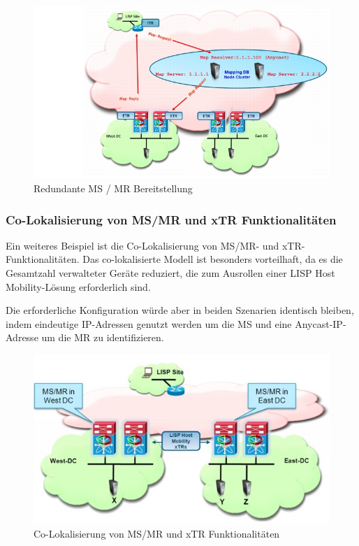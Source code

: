 \begin{figure}[H]
	\centering
	\includegraphics[width=0.9\linewidth]{img/Absicherung/LISP-Example}
	\caption{Redundante MS / MR Bereitstellung \cite{LISP-mobility} }
	\label{fig:Redundante MS / MR Bereitstellung}
\end{figure}

\subsubsection{Co-Lokalisierung von MS/MR und xTR Funktionalitäten}

Ein weiteres Beispiel ist die Co-Lokalisierung  von MS/MR- und xTR-Funktionalitäten. Das co-lokalisierte Modell ist besonders vorteilhaft, da es die Gesamtzahl verwalteter Geräte reduziert, die zum Ausrollen einer LISP Host Mobility-Lösung erforderlich sind. 

Die erforderliche Konfiguration würde aber in beiden Szenarien identisch bleiben, indem eindeutige IP-Adressen genutzt werden um die MS und eine Anycast-IP-Adresse um die MR zu identifizieren.

\begin{figure}[H]
	\centering
	\includegraphics[width=0.8\linewidth]{img/Absicherung/LISP-Example2}
	\caption{Co-Lokalisierung von MS/MR und xTR Funktionalitäten \cite{LISP-mobility} }
	\label{fig:Co-Lokalisierung von MS/MR und xTR Funktionalitaeten}
\end{figure}

